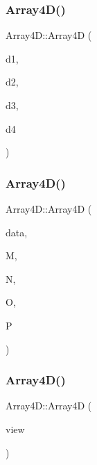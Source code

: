 \mbox{\label{class_array4_d_a2b0e0536b5e40fec5694fdcaebdcff6a}} 
\subsubsection{\texorpdfstring{Array4\+D()}{Array4D()}\hspace{0.1cm}{\footnotesize\ttfamily [3/5]}}
{\footnotesize\ttfamily Array4\+D\+::\+Array4D (\begin{DoxyParamCaption}\item[{size\+\_\+t}]{d1,  }\item[{size\+\_\+t}]{d2,  }\item[{size\+\_\+t}]{d3,  }\item[{size\+\_\+t}]{d4 }\end{DoxyParamCaption})}

\mbox{\label{class_array4_d_a8ee78d0fd3a893d067386b1afd9a742e}} 
\subsubsection{\texorpdfstring{Array4\+D()}{Array4D()}\hspace{0.1cm}{\footnotesize\ttfamily [4/5]}}
{\footnotesize\ttfamily Array4\+D\+::\+Array4D (\begin{DoxyParamCaption}\item[{std\+::vector$<$ double $>$ const \&}]{data,  }\item[{size\+\_\+t}]{M,  }\item[{size\+\_\+t}]{N,  }\item[{size\+\_\+t}]{O,  }\item[{size\+\_\+t}]{P }\end{DoxyParamCaption})}

\mbox{\label{class_array4_d_a5c5b3aa5f576edefc2e9a61afa87e451}} 
\subsubsection{\texorpdfstring{Array4\+D()}{Array4D()}\hspace{0.1cm}{\footnotesize\ttfamily [5/5]}}
{\footnotesize\ttfamily Array4\+D\+::\+Array4D (\begin{DoxyParamCaption}\item[{Array4\+D\+::array\+\_\+view$<$ 4 $>$\+::type \&}]{view }\end{DoxyParamCaption})}

